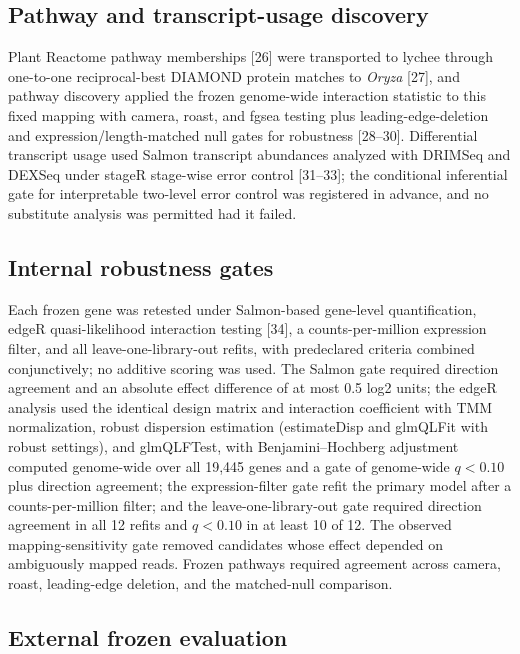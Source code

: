 \documentclass[referee,pdflatex,sn-basic,Numbered]{sn-jnl}
\newcommand{\q}{\textit{q}}
\begin{document}
\subsection{Pathway and transcript-usage discovery}

Plant Reactome pathway memberships [26] were transported to lychee through one-to-one reciprocal-best DIAMOND protein matches to \textit{Oryza} [27], and pathway discovery applied the frozen genome-wide interaction statistic to this fixed mapping with camera, roast, and fgsea testing plus leading-edge-deletion and expression/length-matched null gates for robustness [28--30]. Differential transcript usage used Salmon transcript abundances analyzed with DRIMSeq and DEXSeq under stageR stage-wise error control [31--33]; the conditional inferential gate for interpretable two-level error control was registered in advance, and no substitute analysis was permitted had it failed.

\subsection{Internal robustness gates}

Each frozen gene was retested under Salmon-based gene-level quantification, edgeR quasi-likelihood interaction testing [34], a counts-per-million expression filter, and all leave-one-library-out refits, with predeclared criteria combined conjunctively; no additive scoring was used. The Salmon gate required direction agreement and an absolute effect difference of at most 0.5 log2 units; the edgeR analysis used the identical design matrix and interaction coefficient with TMM normalization, robust dispersion estimation (estimateDisp and glmQLFit with robust settings), and glmQLFTest, with Benjamini--Hochberg adjustment computed genome-wide over all 19,445 genes and a gate of genome-wide $\q<0.10$ plus direction agreement; the expression-filter gate refit the primary model after a counts-per-million filter; and the leave-one-library-out gate required direction agreement in all 12 refits and $\q<0.10$ in at least 10 of 12. The observed mapping-sensitivity gate removed candidates whose effect depended on ambiguously mapped reads. Frozen pathways required agreement across camera, roast, leading-edge deletion, and the matched-null comparison.

\subsection{External frozen evaluation}
\end{document}
